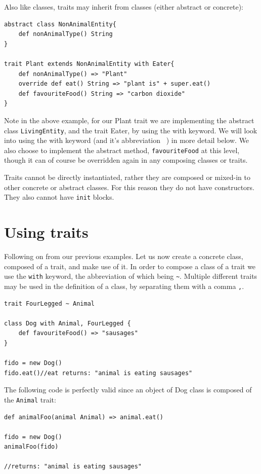 \documentclass[conc-doc]{subfiles}
\begin{document}
Also like classes, traits may inherit from classes (either abstract or concrete):

\begin{lstlisting}
abstract class NonAnimalEntity{
	def nonAnimalType() String
}

trait Plant extends NonAnimalEntity with Eater{
	def nonAnimalType() => "Plant"
	override def eat() String => "plant is" + super.eat()
	def favouriteFood() String => "carbon dioxide"
}
\end{lstlisting}

Note in the above example, for our Plant trait we are implementing the abstract class \lstinline{LivingEntity}, and the trait Eater, by using the with keyword. We will look into using the with keyword (and it's abbreviation ~) in more detail below. We also choose to implement the abstract method, \lstinline{favouriteFood} at this level, though it can of course be overridden again in any composing classes or traits.

Traits cannot be directly instantiated, rather they are composed or mixed-in to other concrete or abstract classes. For this reason they do not have constructors. They also cannot have \lstinline{init} blocks.

\section{Using traits}
Following on from our previous examples. Let us now create a concrete class, composed of a trait, and make use of it. In order to compose a class of a trait we use the \lstinline{with} keyword, the abbreviation of which being \lstinline{~}. Multiple different traits may be used in the definition of a class, by separating them with a comma \lstinline{,}.

\begin{lstlisting}
trait FourLegged ~ Animal

class Dog with Animal, FourLegged {
	def favouriteFood() => "sausages"
}

fido = new Dog()
fido.eat()//eat returns: "animal is eating sausages"
\end{lstlisting}

The following code is perfectly valid since an object of Dog class is composed of the \lstinline{Animal} trait:
\begin{lstlisting}
def animalFoo(animal Animal) => animal.eat()

fido = new Dog()
animalFoo(fido)

//returns: "animal is eating sausages"
\end{lstlisting}
\end{document}
